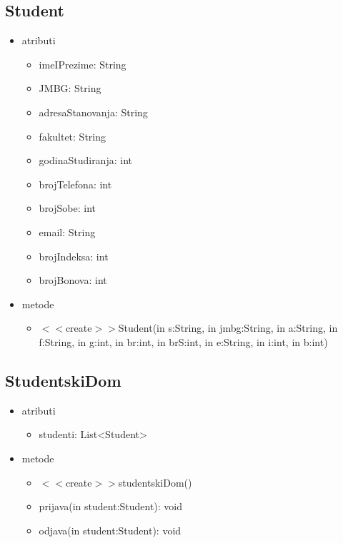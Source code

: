 \documentclass{article}
\begin{document}
\subsection*{Student}
\begin{itemize}
  \item atributi 
     \begin{itemize}
        \item imeIPrezime: String
        \item JMBG: String
        \item adresaStanovanja: String
        \item fakultet: String
        \item godinaStudiranja: int
        \item brojTelefona: int
        \item brojSobe: int
        \item email: String
        \item brojIndeksa: int
        \item brojBonova: int
     \end{itemize}
  \item metode
  \begin{itemize}
        \item \(<<\)create\(>>\)Student(in s:String, in jmbg:String, in a:String, in f:String, in g:int, in br:int, in brS:int, in e:String, in i:int, in b:int)
     \end{itemize}
\end{itemize}

\subsection*{StudentskiDom}
\begin{itemize}
  \item atributi 
     \begin{itemize}
        \item studenti: List<Student>
     \end{itemize}
  \item metode
  \begin{itemize}
        \item \(<<\)create\(>>\)studentskiDom()
        \item prijava(in student:Student): void
        \item odjava(in student:Student): void
     \end{itemize}
\end{itemize}
\end{document}
